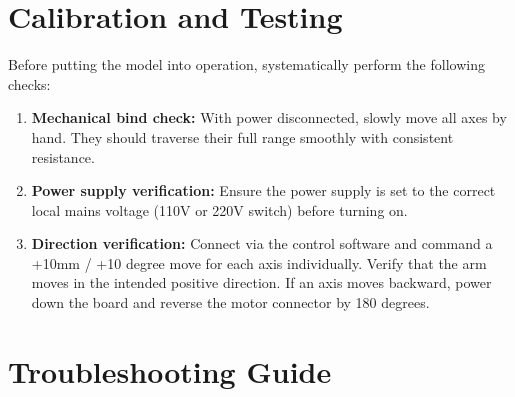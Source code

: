 \documentclass[11pt, a4paper]{article}
\begin{document}
\section{Calibration and Testing}

Before putting the model into operation, systematically perform the following checks:
\begin{enumerate}
    \item \textbf{Mechanical bind check:} With power disconnected, slowly move all axes by hand. They should traverse their full range smoothly with consistent resistance.
    \item \textbf{Power supply verification:} Ensure the power supply is set to the correct local mains voltage (110V or 220V switch) before turning on. 
    \item \textbf{Direction verification:} Connect via the control software and command a +10mm / +10 degree move for each axis individually. Verify that the arm moves in the intended positive direction. If an axis moves backward, power down the board and reverse the motor connector by 180 degrees.
\end{enumerate}

\newpage
\section{Troubleshooting Guide}
\end{document}

